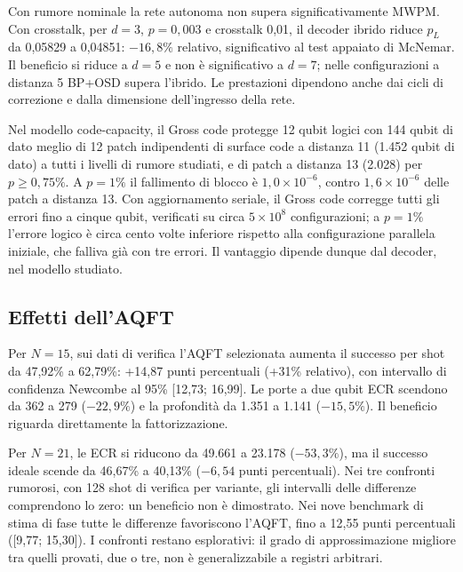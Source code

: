 Con rumore nominale la rete autonoma non supera significativamente MWPM. Con crosstalk, per
\(d = 3\), \(p = 0{,}003\) e crosstalk 0,01, il decoder ibrido riduce \(p_L\) da 0,05829 a
0,04851: \(-16{,}8\%\) relativo, significativo al test appaiato di McNemar. Il beneficio si
riduce a \(d = 5\) e non è significativo a \(d = 7\); nelle configurazioni a distanza 5 BP+OSD
supera l'ibrido. Le prestazioni dipendono anche dai cicli di correzione e dalla dimensione
dell'ingresso della rete.

Nel modello code-capacity, il Gross code protegge 12 qubit logici con 144 qubit di dato meglio
di 12 patch indipendenti di surface code a distanza 11 (1.452 qubit di dato) a tutti i livelli
di rumore studiati, e di patch a distanza 13 (2.028) per \(p \geq 0{,}75\%\). A \(p = 1\%\) il
fallimento di blocco è \(1{,}0 \times 10^{-6}\), contro \(1{,}6 \times 10^{-6}\) delle patch a
distanza 13. Con aggiornamento seriale, il Gross code corregge tutti gli errori fino a cinque
qubit, verificati su circa \(5 \times 10^{8}\) configurazioni; a \(p = 1\%\) l'errore logico è
circa cento volte inferiore rispetto alla configurazione parallela iniziale, che falliva già
con tre errori. Il vantaggio dipende dunque dal decoder, nel modello studiato.

\subsection{Effetti dell'AQFT}

Per \(N = 15\), sui dati di verifica l'AQFT selezionata aumenta il successo per shot da
47,92\% a 62,79\%: +14,87 punti percentuali (+31\% relativo), con intervallo di confidenza
Newcombe al 95\% {[}12,73; 16,99{]}. Le porte a due qubit ECR scendono da 362 a 279
(\(-22{,}9\%\)) e la profondità da 1.351 a 1.141 (\(-15{,}5\%\)). Il beneficio riguarda
direttamente la fattorizzazione.

Per \(N = 21\), le ECR si riducono da 49.661 a 23.178 (\(-53{,}3\%\)), ma il successo ideale
scende da 46,67\% a 40,13\% (\(-6{,}54\) punti percentuali). Nei tre confronti rumorosi, con
128 shot di verifica per variante, gli intervalli delle differenze comprendono lo zero: un
beneficio non è dimostrato. Nei nove benchmark di stima di fase tutte le differenze favoriscono
l'AQFT, fino a 12,55 punti percentuali ({[}9,77; 15,30{]}). I confronti restano esplorativi:
il grado di approssimazione migliore tra quelli provati, due o tre, non è generalizzabile a
registri arbitrari.
